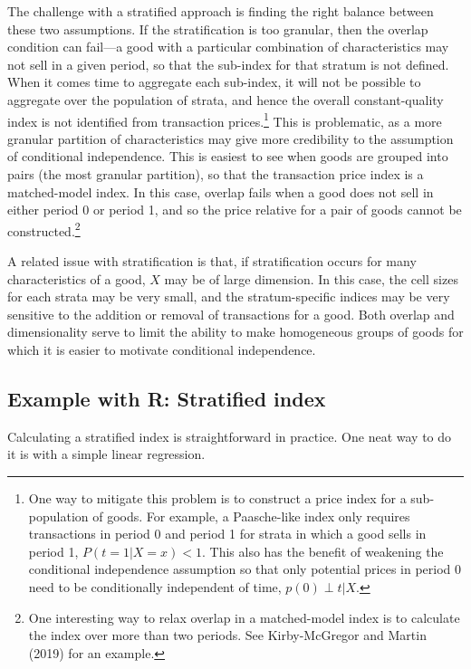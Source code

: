 \documentclass[
]{article}
\begin{document}
The challenge with a stratified approach is finding the right balance between these two assumptions. If the stratification is too granular, then the overlap condition can fail---a good with a particular combination of characteristics may not sell in a given period, so that the sub-index for that stratum is not defined. When it comes time to aggregate each sub-index, it will not be possible to aggregate over the population of strata, and hence the overall constant-quality index is not identified from transaction prices.\footnote{One way to mitigate this problem is to construct a price index for a sub-population of goods. For example, a Paasche-like index only requires transactions in period 0 and period 1 for strata in which a good sells in period 1, \(P(t = 1 | X = x) < 1\). This also has the benefit of weakening the conditional independence assumption so that only potential prices in period 0 need to be conditionally independent of time, \(p(0) \perp t | X\).} This is problematic, as a more granular partition of characteristics may give more credibility to the assumption of conditional independence. This is easiest to see when goods are grouped into pairs (the most granular partition), so that the transaction price index is a matched-model index. In this case, overlap fails when a good does not sell in either period 0 or period 1, and so the price relative for a pair of goods cannot be constructed.\footnote{One interesting way to relax overlap in a matched-model index is to calculate the index over more than two periods. See Kirby-McGregor and Martin (2019) for an example.}

A related issue with stratification is that, if stratification occurs for many characteristics of a good, \(X\) may be of large dimension. In this case, the cell sizes for each strata may be very small, and the stratum-specific indices may be very sensitive to the addition or removal of transactions for a good. Both overlap and dimensionality serve to limit the ability to make homogeneous groups of goods for which it is easier to motivate conditional independence.

\hypertarget{example-with-r-stratified-index}{%
\subsection{Example with R: Stratified index}\label{example-with-r-stratified-index}}

Calculating a stratified index is straightforward in practice. One neat way to do it is with a simple linear regression.
\end{document}

